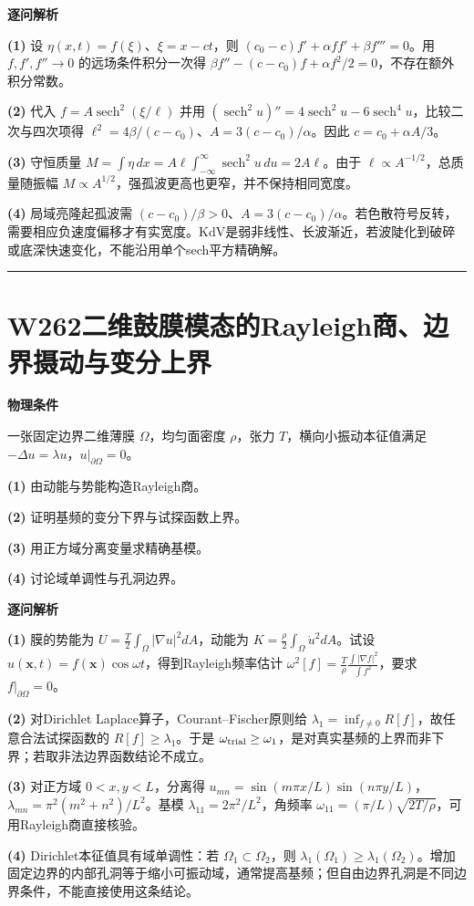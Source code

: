 \documentclass[UTF8,a4paper,11pt,oneside,openany]{ctexbook}
\begin{document}
\par\medskip\noindent\textbf{逐问解析}
\par\noindent\textbf{(1)} 设 \(\eta(x,t)=f(\xi)\)、\(\xi=x-ct\)，则 \((c_0-c)f'+\alpha f f'+\beta f'''=0\)。用 \(f,f',f''\to0\) 的远场条件积分一次得 \(\beta f''-(c-c_0)f+\alpha f^2/2=0\)，不存在额外积分常数。
\par\noindent\textbf{(2)} 代入 \(f=A\operatorname{sech}^2(\xi/\ell)\) 并用 \((\operatorname{sech}^2u)''=4\operatorname{sech}^2u-6\operatorname{sech}^4u\)，比较二次与四次项得 \(\ell^2=4\beta/(c-c_0)\)、\(A=3(c-c_0)/\alpha\)。因此 \(c=c_0+\alpha A/3\)。
\par\noindent\textbf{(3)} 守恒质量 \(M=\int\eta\,dx=A\ell\int_{-\infty}^\infty\operatorname{sech}^2u\,du=2A\ell\)。由于 \(\ell\propto A^{-1/2}\)，总质量随振幅 \(M\propto A^{1/2}\)，强孤波更高也更窄，并不保持相同宽度。
\par\noindent\textbf{(4)} 局域亮隆起孤波需 \((c-c_0)/\beta>0\)、\(A=3(c-c_0)/\alpha\)。若色散符号反转，需要相应负速度偏移才有实宽度。KdV是弱非线性、长波渐近，若波陡化到破碎或底深快速变化，不能沿用单个sech平方精确解。

\par\bigskip\hrule\bigskip
\section*{W262\quad 二维鼓膜模态的Rayleigh商、边界摄动与变分上界}
\textbf{物理条件}\par 一张固定边界二维薄膜 \(\Omega\)，均匀面密度 \(\rho\)，张力 \(T\)，横向小振动本征值满足 \(-\Delta u=\lambda u\)，\(u|_{\partial\Omega}=0\)。
\par\noindent\textbf{(1)} 由动能与势能构造Rayleigh商。
\par\noindent\textbf{(2)} 证明基频的变分下界与试探函数上界。
\par\noindent\textbf{(3)} 用正方域分离变量求精确基模。
\par\noindent\textbf{(4)} 讨论域单调性与孔洞边界。

\par\medskip\noindent\textbf{逐问解析}
\par\noindent\textbf{(1)} 膜的势能为 \(U=\frac T2\int_\Omega|\nabla u|^2dA\)，动能为 \(K=\frac\rho2\int_\Omega \dot u^2dA\)。试设 \(u(\boldsymbol x,t)=f(\boldsymbol x)\cos\omega t\)，得到Rayleigh频率估计 \(\omega^2[f]=\frac T\rho\frac{\int|\nabla f|^2}{\int f^2}\)，要求 \(f|_{\partial\Omega}=0\)。
\par\noindent\textbf{(2)} 对Dirichlet Laplace算子，Courant–Fischer原则给 \(\lambda_1=\inf_{f\ne0}R[f]\)，故任意合法试探函数的 \(R[f]\ge\lambda_1\)。于是 \(\omega_{\rm trial}\ge\omega_1\)，是对真实基频的上界而非下界；若取非法边界函数结论不成立。
\par\noindent\textbf{(3)} 对正方域 \(0<x,y<L\)，分离得 \(u_{mn}=\sin(m\pi x/L)\sin(n\pi y/L)\)，\(\lambda_{mn}=\pi^2(m^2+n^2)/L^2\)。基模 \(\lambda_{11}=2\pi^2/L^2\)，角频率 \(\omega_{11}=(\pi/L)\sqrt{2T/\rho}\)，可用Rayleigh商直接核验。
\par\noindent\textbf{(4)} Dirichlet本征值具有域单调性：若 \(\Omega_1\subset\Omega_2\)，则 \(\lambda_1(\Omega_1)\ge\lambda_1(\Omega_2)\)。增加固定边界的内部孔洞等于缩小可振动域，通常提高基频；但自由边界孔洞是不同边界条件，不能直接使用这条结论。
\end{document}
